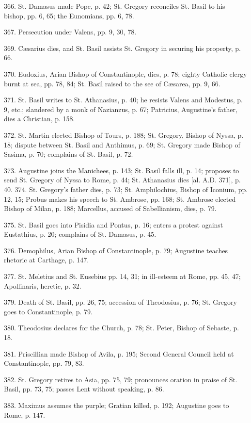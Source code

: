 366.
St. Damasus made Pope, p. 42; St. Gregory
reconciles St. Basil to his bishop, pp. 6, 65; the Eunomians,
pp. 6, 78.

367.
Persecution under Valens, pp. 9, 30, 78.

369.
Cæsarius dies, and St. Basil assists St.
Gregory in securing his property, p. 66.

370.
Eudoxius, Arian Bishop of Constantinople, dies,
p. 78; eighty Catholic clergy burnt at sea, pp. 78, 84; St.
Basil raised to the see of Cæsarea, pp. 9, 66.

371.
St. Basil writes to St. Athanasius, p. 40; he
resists Valens and Modestus, p. 9, etc.; slandered by a monk
of Nazianzus, p. 67; Patricius, Augustine's father, dies a
Christian, p. 158.

372.
St. Martin elected Bishop of Tours, p. 188; St.
Gregory, Bishop of Nyssa, p. 18; dispute between St. Basil and
Anthimus, p. 69; St. Gregory made Bishop of Sasima, p. 70;
complains of St. Basil, p. 72.

373.
Augustine joins the Manichees, p. 143; St.
Basil falls ill, p. 14; proposes to send St. Gregory of Nyssa
to Rome, p. 44; St. Athanasius dies [al. A.D.
371], p. 40. 374.
St. Gregory's father dies, p. 73; St.
Amphilochius, Bishop of Iconium, pp. 12, 15; Probus makes his
speech to St. Ambrose, pp. 168; St. Ambrose elected Bishop of
Milan, p. 188; Marcellus, accused of Sabellianism, dies, p.
79.

375.
St. Basil goes into Pisidia and Pontus, p. 16;
enters a protest against Eustathius, p. 20; complains of St.
Damasus, p. 45.

376.
Demophilus, Arian Bishop of Constantinople, p.
79; Augustine teaches rhetoric at Carthage, p. 147.

377.
St. Meletius and St. Eusebius pp. 14, 31; in
ill-esteem at Rome, pp. 45, 47; Apollinaris, heretic, p. 32.

379.
Death of St. Basil, pp. 26, 75; accession of
Theodosius, p. 76; St. Gregory goes to Constantinople, p. 79.

380.
Theodosius declares for the Church, p. 78; St.
Peter, Bishop of Sebaste, p. 18.

381.
Priscillian made Bishop of Avila, p. 195;
Second General Council held at Constantinople, pp. 79, 83.

382.
St. Gregory retires to Asia, pp. 75, 79;
pronounces oration in praise of St. Basil, pp. 73, 75; passes
Lent without speaking, p. 86.

383.
Maximus assumes the purple; Gratian killed, p.
192; Augustine goes to Rome, p. 147.


